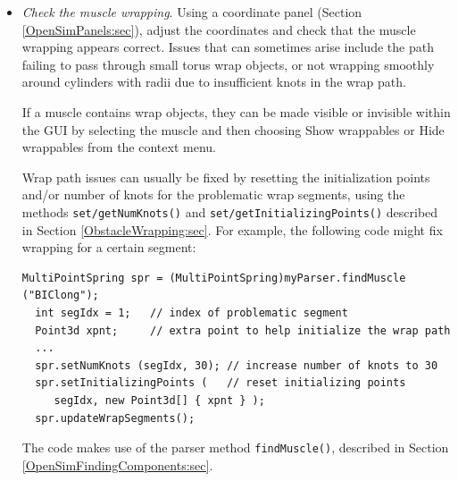 \begin{itemize}
In addition to gravity, you can also use the pull controller (see ``Pull
manipulation'' in the ) to apply point forces to the various bodies. The main point of the
exercise is to see how the model behaves under gravity-like loads, and adjust
the damping parameters (Section \ref{BodyDamping:sec}) so that bodies come to
rest after an appropriate time. Critical, or slightly sub-critical, damping can
usually be achieved by setting the inertial damping for the {\tt MechModel} to
values in the range of 1-5, but sometimes one may want to adjust damping for
specific bodies, or also specify rotary or frame damping.

\begin{sideblock}
Damping in an ArtiSynth model is typically applied directly to its particles
and rigid bodies, and reflects the fact that body poses and velocities, instead
of joint coordinates and speeds, are the primary means of specifying the
model's dynamic state. OpenSim models often specify damping using {\tt
CoordinateLimitForces}; one may wish to remove or limit the use of those
components in ArtiSynth. Likewise, one may wish to reduce the use of damping in
the muscle forces.
\end{sideblock}

\item {\it Check the muscle wrapping}. Using a coordinate panel (Section
\ref{OpenSimPanels:sec}), adjust the coordinates and check that the muscle
wrapping appears correct. Issues that can sometimes arise include the path
failing to pass through small torus wrap objects, or not wrapping smoothly
around cylinders with radii due to insufficient knots in the wrap path.

\begin{sideblock}
If a muscle contains wrap objects, they can be made visible or invisible within
the GUI by selecting the muscle and then choosing {\sf Show wrappables} or {\sf
Hide wrappables} from the context menu.
\end{sideblock}

Wrap path issues can usually be fixed by resetting the initialization points
and/or number of knots for the problematic wrap segments, using the methods
{\tt set/getNumKnots()} and {\tt set/getInitializingPoints()} described in
Section \ref{ObstacleWrapping:sec}. For example, the following
code might fix wrapping for a certain segment:
%
\begin{lstlisting}[]
  MultiPointSpring spr = (MultiPointSpring)myParser.findMuscle ("BIClong");
  int segIdx = 1;   // index of problematic segment
  Point3d xpnt;     // extra point to help initialize the wrap path
  ...
  spr.setNumKnots (segIdx, 30); // increase number of knots to 30
  spr.setInitializingPoints (   // reset initializing points
     segIdx, new Point3d[] { xpnt } ); 
  spr.updateWrapSegments();
\end{lstlisting}
%
The code makes use of the parser method {\tt findMuscle()},
described in Section \ref{OpenSimFindingComponents:sec}.


\end{itemize}
